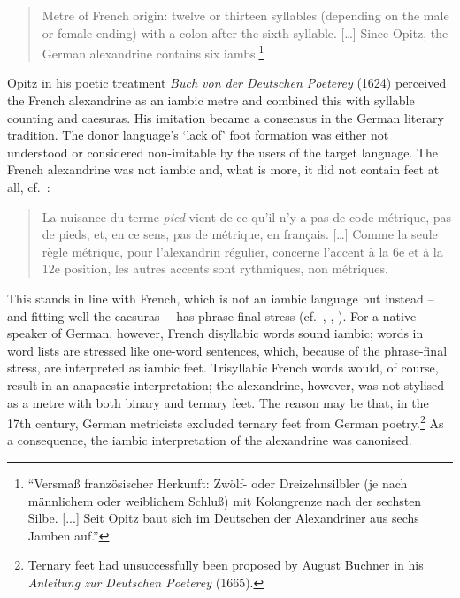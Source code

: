 \documentclass[output=paper
  ,nobabel
  ,uniformtopskip %
]{langscibook}
\begin{document}
\begin{quote}
Metre of French origin: twelve or thirteen syllables (depending on the male or female ending) with a colon after the sixth syllable. […] Since Opitz, the German alexandrine contains six iambs.\footnote{``Versmaß französischer Herkunft: Zwölf- oder Dreizehnsilbler (je nach männlichem oder weiblichem Schluß) mit Kolongrenze nach der sechsten Silbe. [...] Seit Opitz baut sich im Deutschen der Alexandriner aus sechs Jamben auf.''}
\end{quote}

\noindent
Opitz in his poetic treatment \textit{Buch von der Deutschen Poeterey} (1624) perceived the French alexandrine as an iambic metre and combined this with syllable counting and caesuras. His imitation became a consensus in the German literary tradition. The donor language's `lack of' foot formation was either not understood or considered non-imitable by the users of the target language. The French alexandrine was not iambic and, what is more, it did not contain feet at all, cf.\ \citet[229]{Meschonnic1982}:


\begin{quote}
La nuisance du terme \textit{pied} vient de ce qu'il n'y a pas de code métrique, pas de pieds, et, en ce sens, pas de métrique, en français. […] Comme la seule règle métrique, pour l'alexandrin régulier, concerne l'accent à la 6e et à la 12e position, les autres accents sont rythmiques, non métriques. 
\end{quote}

\noindent
This stands in line with French, which is not an iambic language but instead – and fitting well the caesuras –~has phrase-final stress (cf.\ \citealt[229]{Meschonnic1982}, \citealt{Kurylowicz1945}, \citealt{JunFougeron2002}). For a native speaker of German, however, French disyllabic words sound iambic; words in word lists are stressed like one-word sentences, which, because of the phrase-final stress, are interpreted as iambic feet. Trisyllabic French words would, of course, result in an anapaestic interpretation; the alexandrine, however, was not stylised as a metre with both binary and ternary feet. The reason may be that, in the 17th century, German metricists excluded ternary feet from German poetry.\footnote{Ternary feet had unsuccessfully been proposed by August Buchner in his \textit{Anleitung zur Deutschen Poeterey} (1665).} As a consequence, the iambic interpretation of the alexandrine was canonised. 
\end{document}
